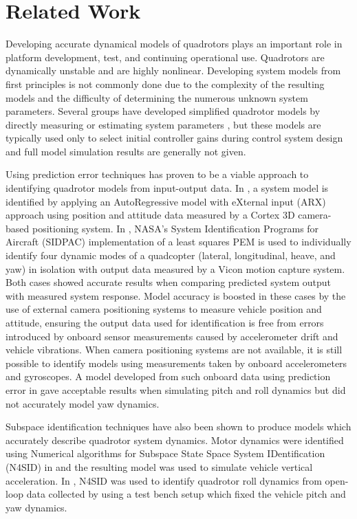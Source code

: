\section{Related Work}
Developing accurate dynamical models of quadrotors plays an important role in platform development, test, and continuing operational use. Quadrotors are dynamically unstable and are highly nonlinear. Developing system models from first principles is not commonly done due to the complexity of the resulting models and the difficulty of determining the numerous unknown system parameters. Several groups have developed simplified quadrotor models by directly measuring or estimating system parameters \cite{bresciani2008modelling, domingues2009quadrotor, kivrak2006design, pounds2006modelling, schreier2012modeling}, but these models are typically used only to select initial controller gains during control system design and full model simulation results are generally not given. 

Using prediction error techniques has proven to be a viable approach to identifying quadrotor models from input-output data. In \cite{chamberlain2011system}, a system model is identified by applying an AutoRegressive model with eXternal input (ARX) approach using position and attitude data measured by a Cortex 3D camera-based positioning system. In \cite{miller2011open}, NASA's System Identification Programs for Aircraft (SIDPAC) implementation of a least squares PEM is used to individually identify four dynamic modes of a quadcopter (lateral, longitudinal, heave, and yaw) in isolation with output data measured by a Vicon motion capture system. Both cases showed accurate results when comparing predicted system output with measured system response. Model accuracy is boosted in these cases by the use of external camera positioning systems to measure vehicle position and attitude, ensuring the output data used for identification is free from errors introduced by onboard sensor measurements caused by accelerometer drift and vehicle vibrations. When camera positioning systems are not available, it is still possible to identify models using measurements taken by onboard accelerometers and gyroscopes.  A model developed from such onboard data using prediction error in \cite{lee2011attitude} gave acceptable results when simulating pitch and roll dynamics but did not accurately model yaw dynamics.

Subspace identification techniques have also been shown to produce models which accurately describe quadrotor system dynamics. Motor dynamics were identified using Numerical algorithms for Subspace State Space System IDentification (N4SID) in \cite{kis2011sensor} and the resulting model was used to simulate vehicle vertical acceleration. In \cite{batmazdesign}, N4SID was used to identify quadrotor roll dynamics from open-loop data collected by using a test bench setup  which fixed the vehicle pitch and yaw dynamics. 


